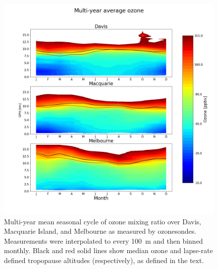    \begin{figure}[t]
      \includegraphics[width=12.0cm]{Figures/Ozone/seasonaltropozone}
      \caption{ %
        Multi-year mean seasonal cycle of ozone mixing ratio over Davis, Macquarie Island, and Melbourne as measured by ozonesondes.
        Measurements were interpolated to every 100~m and then binned monthly.
        Black and red solid lines show median ozone and lapse-rate defined tropopause altitudes (respectively), as defined in the text. }
      \label{Ozone:fig:seasonaltropozone}
    \end{figure}
  

